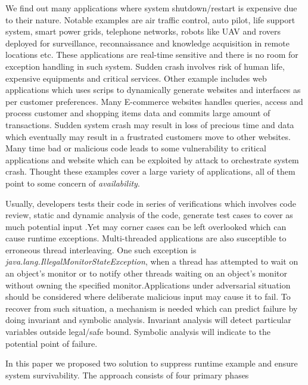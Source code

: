 \documentclass{sigplanconf}
\begin{document}
We find out many applications where system shutdown/restart is expensive due to their nature. 
Notable examples are air traffic control, auto pilot, life support system, smart power grids, telephone networks, 
robots like UAV and rovers deployed for surveillance, reconnaissance and knowledge acquisition in remote locations etc. 
These applications are real-time sensitive and there is no room for exception handling in such system. 
Sudden crash involves risk of human life, expensive equipments and critical services. 
Other example includes web applications which uses scrips to dynamically generate websites and interfaces as per customer preferences. 
Many E-commerce websites handles queries, access and process customer and shopping items data and commits large amount of transactions. 
Sudden system crash may result in loss of precious time and data which eventually may result in a frustrated customers move to other websites. 
Many time bad or malicious code leads to some vulnerability to critical applications and website which can be exploited by attack to orchestrate 
system crash. Thought these examples cover a large variety of applications, all of them point to some concern of \emph{availability}.

Usually, developers tests their code in series of verifications which involves code review, static and dynamic analysis of the code, 
generate test cases to cover as much potential input .Yet may corner cases can be left overlooked which can cause runtime exceptions. 
Multi-threaded applications are also susceptible to erroneous thread interleaving. One such exception is \emph{java.lang.IllegalMonitorStateException},
 when a thread has attempted to wait on an object's monitor or to notify other threads waiting on an object's monitor 
 without owning the specified monitor.Applications under adversarial situation should be considered where deliberate malicious input may cause it to fail. 
 To recover from such situation, a mechanism is needed which can predict failure by doing invariant and symbolic analysis. 
 Invariant analysis will detect particular variables outside legal/safe bound. Symbolic analysis will indicate to the potential point of failure. 

In this paper we proposed two solution to suppress runtime example and ensure system survivability. The approach consists of four primary phases
\end{document}
